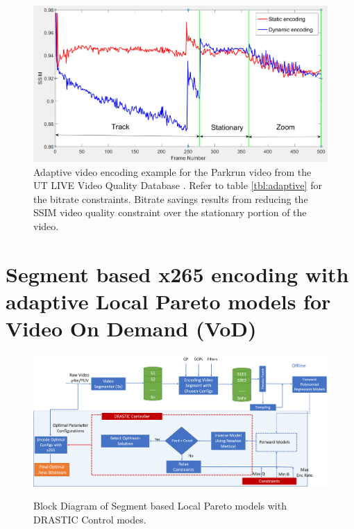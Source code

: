 \documentclass{book}
\begin{document}
\begin{figure}
	\includegraphics[width=\linewidth, clip]{pictures/ch3/ShieldSSIM.png}
	\caption{\label{fig:adaptiveEncSh}
		Adaptive video encoding example for the Parkrun video from the 
		UT LIVE Video Quality Database \cite{Kalpana}.
		Refer to table \ref{tbl:adaptive} for the bitrate constraints.
		Bitrate savings results from reducing the SSIM video quality
		constraint over the stationary portion of the video.
	}
\end{figure}





%
%
\chapter[Segment based x265 encoding with adaptive Local Pareto models for VoD]{Segment based x265 encoding with adaptive Local Pareto models for  Video On Demand (VoD)}


\begin{figure}[hbt!]
    
     	{\includegraphics[width=\columnwidth]{pictures/ch4/DRASTIC_x265_Seg_Enc.png}\\
     		\label{fig:Segblkdiag}}
     	\caption{Block Diagram of Segment based Local Pareto models with DRASTIC Control modes.}
\end{figure}
     
\end{document}
